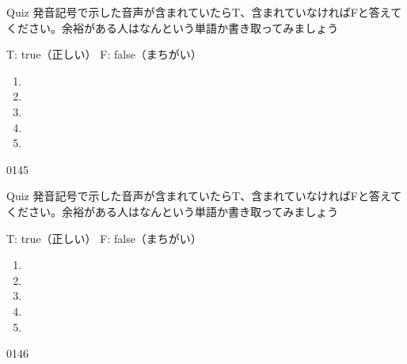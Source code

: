 \documentclass[aspectratio=169,xcolor={dvipsnames,table}]{beamer}
\begin{document}
\begin{frame}[plain]{Quiz }
\large
発音記号で示した音声が含まれていたらT、含まれていなければFと答えてください。余裕がある人はなんという単語か書き取ってみましょう

\hfill{}{\scriptsize T: true（正しい）\hspace{5pt} F: false（まちがい）}
 \begin{enumerate}
  \item \mbox{}\hspace{1\zw}
  \item \mbox{}\hspace{1\zw}
  \item \mbox{}\hspace{1\zw}
  \item \mbox{}\hspace{1\zw}
  \item \mbox{}\hspace{1\zw}
 \end{enumerate}

\hfill{\tiny 0145}\,{\scriptsize {}}

\end{frame}
\begin{frame}[plain]{Quiz}
\hypertarget{ex}{}
\large
発音記号で示した音声が含まれていたらT、含まれていなければFと答えてください。余裕がある人はなんという単語か書き取ってみましょう

\hfill{}{\scriptsize T: true（正しい）\hspace{5pt} F: false（まちがい）}
 \begin{enumerate}
  \item \mbox{}\hspace{1\zw}
  \item \mbox{}\visible<3->{T}\hspace{1\zw}
  \item \mbox{}\hspace{1\zw}
  \item \mbox{}\visible<5->{F}\hspace{1\zw}
  \item \mbox{}\hspace{1\zw}
 \end{enumerate}

\hfill{\tiny 0146}\,{\scriptsize {}}
\end{frame}
\end{document}
